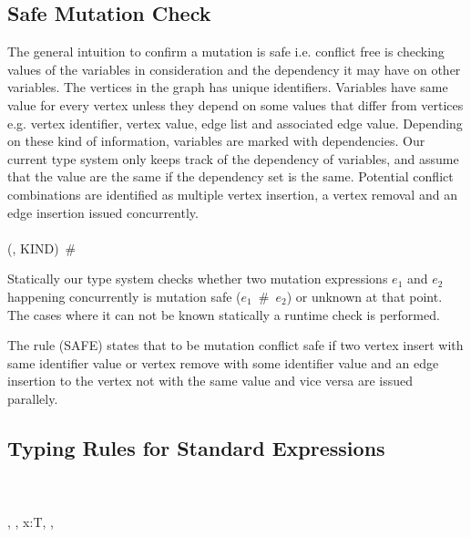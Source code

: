 \subsection{Safe Mutation Check}
\label{subsec:safeMute}

The general intuition to confirm a mutation is safe i.e. conflict free is checking values of the variables in consideration and the dependency it may have on other variables. The vertices in the graph has unique identifiers. Variables have same value for every vertex unless they depend on some values that differ from vertices e.g. vertex identifier, vertex value, edge list and associated edge value. Depending on these kind of information, variables are marked with dependencies. Our current type system only keeps track of the dependency of variables, and assume that the value are the same if the dependency set is the same. Potential conflict combinations are identified as multiple vertex insertion, a vertex removal and an edge insertion issued concurrently.
\ \\
\ \\
    {(\psi , KIND)~\#~\Delta }

\smallskip

Statically our type system checks whether two mutation expressions $e_1$ and $e_2$ happening concurrently is mutation safe ($e_1$~\#~$e_2$) or unknown at that point. The cases where it can not be known statically a runtime check is performed.

The rule (SAFE) states that to be mutation conflict safe if two vertex insert with same identifier value or vertex remove with some identifier value and an edge insertion to the vertex not with the same value and vice versa are issued parallely. 

\subsection{Typing Rules for Standard Expressions}
\label{subsec:standardRules}
\ \\
\ \\
    {\Gamma, \Lambda, \Delta \vdash x:T, \Lambda, \Delta}

